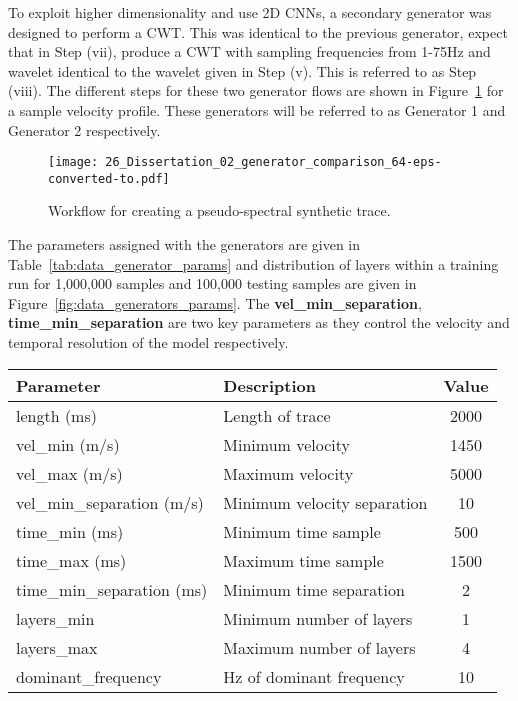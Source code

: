To exploit higher dimensionality and use 2D CNNs, a secondary generator was designed to perform a \ac{CWT}. This was identical to the previous generator, expect that in Step (vii), produce a CWT with sampling frequencies from 1-75\si{Hz} and wavelet identical to the wavelet given in Step (v). This is referred to as Step (viii). The different steps for these two generator flows are shown in Figure~\ref{fig:data_generators} for a sample velocity profile. These generators will be referred to as Generator 1 and Generator 2 respectively.

\begin{figure}[ht!]
	\centering
	\texttt{[image: 26\_Dissertation\_02\_generator\_comparison\_64-eps-converted-to.pdf]}
	\caption[Workflow for creating a pseudo-spectral synthetic trace.]{Workflow for creating a pseudo-spectral synthetic trace.}
	\label{fig:data_generators}
\end{figure}
\clearpage
The parameters assigned with the generators are given in Table~\ref{tab:data_generator_params} and distribution of layers within a training run for 1,000,000 samples and 100,000 testing samples are given in Figure~\ref{fig:data_generators_params}. The \textbf{vel\_min\_separation}, \textbf{time\_min\_separation} are two key parameters as they control the velocity and temporal resolution of the model respectively.

\begin{table*}[ht!]
    \centering
    \begin{tabular}{@{}llc@{}}\toprule
        Parameter                  & Description                 & Value\\ \hline
        length (ms)                & Length of trace             & 2000  \\
        vel\_min (m/s)             & Minimum velocity            & 1450  \\
        vel\_max (m/s)             & Maximum velocity            & 5000  \\
        vel\_min\_separation (m/s) & Minimum velocity separation & 10    \\
        time\_min (ms)             & Minimum time sample         & 500   \\
        time\_max (ms)             & Maximum time sample         & 1500  \\
        time\_min\_separation (ms) & Minimum time separation     & 2     \\
        layers\_min                & Minimum number of layers    & 1     \\
        layers\_max                & Maximum number of layers    & 4     \\
        dominant\_frequency        &\si{Hz} of dominant frequency & 10     \\ \hline
    \end{tabular}
    \caption{Synthetic data generator parameters.}\label{tab:data_generator_params}
\end{table*}

